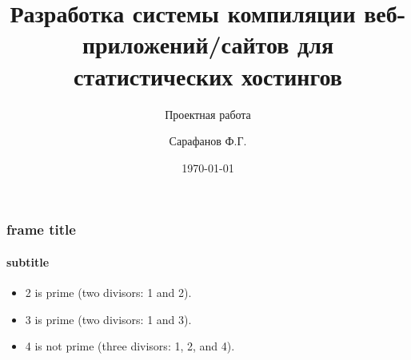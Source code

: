 \documentclass[10pt,pdf,hyperref={unicode}, aspectratio=1610]{beamer}
\title{Разработка системы компиляции веб-приложений/сайтов для статистических хостингов}
\subtitle{Проектная работа}
\author{Сарафанов Ф.Г.}
\date{\today}
\begin{document}
\begin{frame}
\titlepage
\end{frame} 

\begin{frame}
\frametitle{frame title} 
\framesubtitle{subtitle}

\end{frame}

\begin{frame}
\begin{itemize}
\item 2 is prime (two divisors: 1 and 2).
\pause
\item 3 is prime (two divisors: 1 and 3).
\pause
\item 4 is not prime (\alert{three} divisors: 1, 2, and 4).
\end{itemize}
\end{frame}
\end{document}
